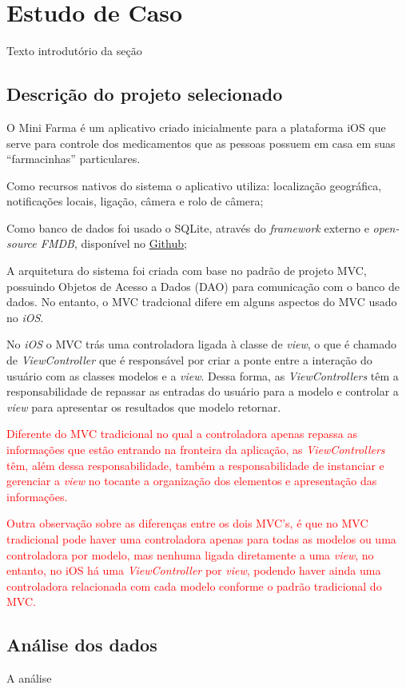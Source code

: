 \chapter{Estudo de Caso} \label{estudodecaso}

Texto introdutório da seção

\section{Descrição do projeto selecionado} \label{subsec:descricaodoprojeto}

O Mini Farma é um aplicativo criado inicialmente para a plataforma iOS que serve para controle dos medicamentos que as 
pessoas possuem em casa em suas ``farmacinhas'' particulares.


Como recursos nativos do sistema o aplicativo utiliza: localização geográfica, notificações locais, ligação, câmera e rolo de câmera;


Como banco de dados foi usado o SQLite, através do \textit{framework} externo e \textit{open-source FMDB}, 
disponível no \href{https://github.com/ccgus/fmdb}{Github};

A arquitetura do sistema foi criada com base no padrão de projeto MVC, possuindo Objetos de Acesso a Dados (DAO) para comunicação 
com o banco de dados. No entanto, o MVC tradcional difere em alguns aspectos do MVC usado no \textit{iOS}. 

No \textit{iOS} o MVC trás uma controladora ligada à classe de \textit{view}, o que é chamado de \textit{ViewController} que é responsável por 
criar a ponte entre a interação do usuário com as classes modelos e a \textit{view}. Dessa forma, as \textit{ViewControllers} têm a 
responsabilidade de repassar as entradas do usuário para a modelo e controlar a \textit{view} para apresentar os resultados que modelo retornar. 


\textcolor{red}{Diferente do MVC tradicional no qual a controladora apenas repassa as informações que estão entrando na fronteira da aplicação, 
as \textit{ViewControllers} têm, além dessa responsabilidade, também a responsabilidade de instanciar e gerenciar a \textit{view} no tocante
a organização dos elementos e apresentação das informações.}


\textcolor{red}{Outra observação sobre as diferenças entre os dois MVC's, é que no MVC tradicional pode haver uma controladora apenas 
para todas as modelos ou uma controladora por modelo, mas nenhuma ligada diretamente a uma \textit{view}, no entanto, no iOS há uma 
\textit{ViewController} por \textit{view}, podendo haver ainda uma controladora relacionada com cada modelo conforme o padrão tradicional do MVC.}


\section{Análise dos dados} \label{sec:analise}

A análise